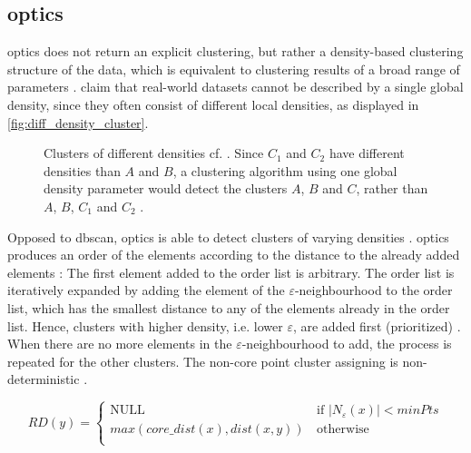 \subsection{\acs*{optics}}\label{subsec:optics}

\ac{optics} does not return an explicit clustering, but rather a density-based clustering structure of the data, 
which is equivalent to clustering results of a broad range of parameters \cite{OPTICS1999}.
\citeauthor{OPTICS1999} claim that real-world datasets cannot be described by a single global density, since they often consist of different local densities, 
as displayed in \autoref{fig:diff_density_cluster}.

\begin{figure}[htp] %
    \centering
    
    \caption{Clusters of different densities cf. \cite{OPTICS1999}.
    Since $C_1$ and $C_2$ have different densities than $A$ and $B$, a clustering algorithm using one global density parameter would detect the clusters $A$, $B$ and $C$, 
    rather than $A$, $B$, $C_1$ and $C_2$ .
    }
    \label{fig:diff_density_cluster}
\end{figure}

Opposed to \ac{dbscan}, \ac{optics} is able to detect clusters of varying densities \cite{OPTICS2014}.
\ac{optics} produces an order of the elements according to the distance to the already added elements \cite{OPTICS2014, OPTICS2013}:
The first element added to the order list is arbitrary.
The order list is iteratively expanded by adding the element of the $\varepsilon$-neighbourhood to the order list, which has the smallest distance to any of the elements already in the order list.
Hence, clusters with higher density, i.e. lower $\varepsilon$, are added first (prioritized) \cite{OPTICS_kMeans_2016, OPTICS1999}.
When there are no more elements in the $\varepsilon$-neighbourhood to add, the process is repeated for the other clusters.
The non-core point cluster assigning is non-deterministic \cite{OPTICS2013}.

\begin{equation}
    RD(y) = \left\{
    \begin{array}{ll}
    \textrm{NULL} & \, \textrm{if |}N_\varepsilon (x)| < minPts \\
    max(core\_dist(x), dist(x,y)) & \, \textrm{otherwise} \\
    \end{array}
    \right. 
    \label{eq:optics-reachability-distance}
\end{equation}

